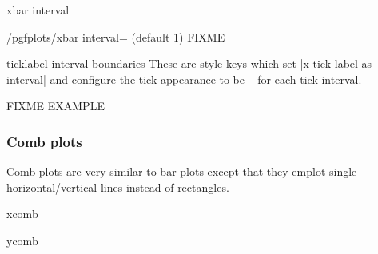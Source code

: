 \begin{plottype}{xbar interval}
\begin{codeexample}[]
\end{codeexample}
\end{plottype}

\begin{stylekey}{/pgfplots/xbar interval= (default 1)}
	FIXME
\end{stylekey}

\begin{pgfplotsxykey}{\x ticklabel interval boundaries}
	These are style keys which set |x tick label as interval| and configure the tick appearance to be  --  for each tick interval.

	FIXME EXAMPLE
\end{pgfplotsxykey}

\subsubsection{Comb plots}
Comb plots are very similar to bar plots except that they emplot single horizontal/vertical lines instead of rectangles.

\begin{plottype}{xcomb}
\end{plottype}

\begin{plottype}{ycomb}
\end{plottype}

